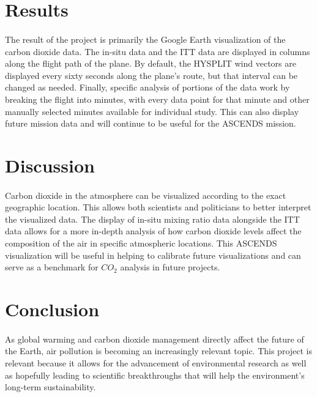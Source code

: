 \documentclass[12pt,letterpaper]{report}
\begin{document}
 \section*{Results}
  \paragraph{}
The result of the project is primarily the Google Earth visualization of the carbon dioxide data. The in-situ data and the ITT data are displayed in columns along the flight path of the plane. By default, the HYSPLIT wind vectors are displayed every sixty seconds along the plane's route, but that interval can be changed as needed. Finally, specific analysis of portions of the data work by breaking the flight into minutes, with every data point for that minute and other manually selected minutes available for individual study. This can also display future mission data and will continue to be useful for the ASCENDS mission.

 \section*{Discussion}
  \paragraph{}
   Carbon dioxide in the atmosphere can be visualized according to the exact geographic location. This allows both scientists and politicians to better interpret the visualized data. The display of in-situ mixing ratio data alongside the ITT data allows for a more in-depth analysis of how carbon dioxide levels affect the composition of the air in specific atmospheric locations. This ASCENDS visualization will be useful in helping to calibrate future visualizations and can serve as a benchmark for $CO_2$ analysis in future projects.
 \section*{Conclusion}
  \paragraph{}
   As global warming and carbon dioxide management directly affect the future of the Earth, air pollution is becoming an increasingly relevant topic.  This project is relevant because it allows for the advancement of environmental research as well as hopefully leading to scientific breakthroughs that will help the environment's long-term sustainability.
\end{document}
